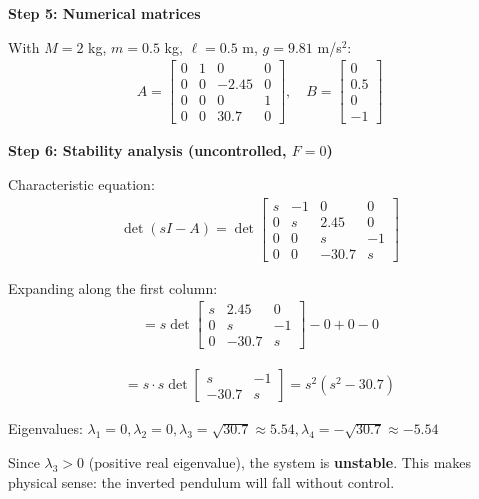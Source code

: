 \documentclass[11pt,a4paper]{article}
\begin{document}
\textbf{Step 5: Numerical matrices}

With $M = 2$ kg, $m = 0.5$ kg, $\ell = 0.5$ m, $g = 9.81$ m/s$^2$:
\begin{align}
  A = \begin{bmatrix} 0 & 1 & 0 & 0 \\ 0 & 0 & -2.45 & 0 \\ 0 & 0 & 0 & 1 \\ 0 & 0 & 30.7 & 0 \end{bmatrix}, \quad B = \begin{bmatrix} 0 \\ 0.5 \\ 0 \\ -1 \end{bmatrix}
\end{align}

\textbf{Step 6: Stability analysis (uncontrolled, $F = 0$)}

Characteristic equation:
\begin{align}
  \det(sI - A) = \det\begin{bmatrix} s & -1 & 0 & 0 \\ 0 & s & 2.45 & 0 \\ 0 & 0 & s & -1 \\ 0 & 0 & -30.7 & s \end{bmatrix}
\end{align}

Expanding along the first column:
\begin{align}
  = s \det\begin{bmatrix} s & 2.45 & 0 \\ 0 & s & -1 \\ 0 & -30.7 & s \end{bmatrix} - 0 + 0 - 0
\end{align}

\begin{align}
  = s \cdot s \det\begin{bmatrix} s & -1 \\ -30.7 & s \end{bmatrix} = s^2(s^2 - 30.7)
\end{align}

Eigenvalues: $\lambda_1 = 0, \lambda_2 = 0, \lambda_3 = \sqrt{30.7} \approx 5.54, \lambda_4 = -\sqrt{30.7} \approx -5.54$

Since $\lambda_3 > 0$ (positive real eigenvalue), the system is \textbf{unstable}. This makes physical sense: the inverted pendulum will fall without control.
\end{document}
